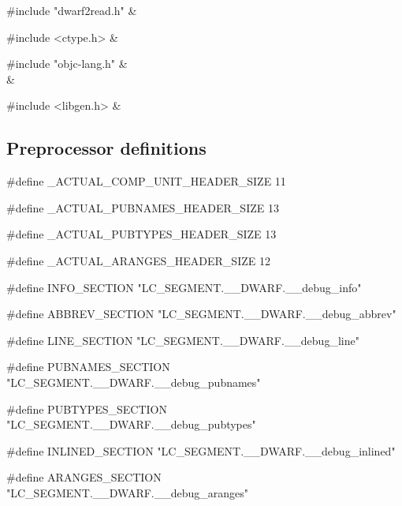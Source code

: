 \medskip
\begin{cxreftabi}
{\stt \#include "dwarf2read.h"} &\\
\end{cxreftabi}

\medskip
\begin{cxreftabi}
{\stt \#include <ctype.h>} &\\
\end{cxreftabi}

\medskip
\begin{cxreftabi}
{\stt \#include "objc-lang.h"} &\\
\hspace*{0.2in}{\stt \#include <Availability.h>} &\\
\end{cxreftabi}

\medskip
\begin{cxreftabi}
{\stt \#include <libgen.h>} &\\
\end{cxreftabi}


\subsection*{Preprocessor definitions}

{\stt \#define \_ACTUAL\_COMP\_UNIT\_HEADER\_SIZE 11}

\medskip
{\stt \#define \_ACTUAL\_PUBNAMES\_HEADER\_SIZE 13}

\medskip
{\stt \#define \_ACTUAL\_PUBTYPES\_HEADER\_SIZE 13}

\medskip
{\stt \#define \_ACTUAL\_ARANGES\_HEADER\_SIZE 12}

\medskip
{\stt \#define INFO\_SECTION "LC\_SEGMENT.\_\_DWARF.\_\_debug\_info"}

\medskip
{\stt \#define ABBREV\_SECTION "LC\_SEGMENT.\_\_DWARF.\_\_debug\_abbrev"}

\medskip
{\stt \#define LINE\_SECTION "LC\_SEGMENT.\_\_DWARF.\_\_debug\_line"}

\medskip
{\stt \#define PUBNAMES\_SECTION "LC\_SEGMENT.\_\_DWARF.\_\_debug\_pubnames"}

\medskip
{\stt \#define PUBTYPES\_SECTION "LC\_SEGMENT.\_\_DWARF.\_\_debug\_pubtypes"}

\medskip
{\stt \#define INLINED\_SECTION "LC\_SEGMENT.\_\_DWARF.\_\_debug\_inlined"}

\medskip
{\stt \#define ARANGES\_SECTION "LC\_SEGMENT.\_\_DWARF.\_\_debug\_aranges"}

